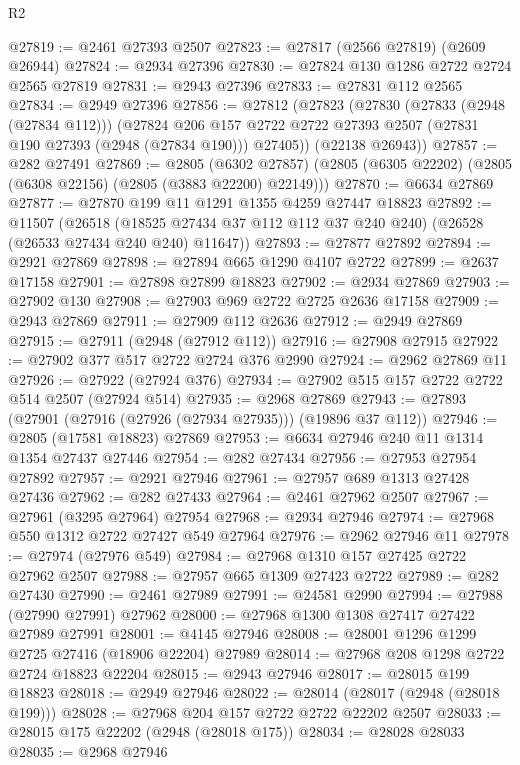 \begin{lexlean}{R2}
\begin{coremodule}
@27819 := @2461 @27393 @2507
@27823 := @27817 (@2566 @27819) (@2609 @26944)
@27824 := @2934 @27396
@27830 := @27824 @130 @1286 @2722 @2724 @2565 @27819
@27831 := @2943 @27396
@27833 := @27831 @112 @2565
@27834 := @2949 @27396
@27856 := @27812
    (@27823
      (@27830
        (@27833 (@2948 (@27834 @112)))
        (@27824
          @206
          @157
          @2722
          @2722
          @27393
          @2507
          (@27831 @190 @27393 (@2948 (@27834 @190)))
          @27405))
      (@22138 @26943))
@27857 := @282 @27491
@27869 := @2805
    (@6302 @27857)
    (@2805 (@6305 @22202) (@2805 (@6308 @22156) (@2805 (@3883 @22200) @22149)))
@27870 := @6634 @27869
@27877 := @27870 @199 @11 @1291 @1355 @4259 @27447 @18823
@27892 := @11507
    (@26518 (@18525 @27434 @37 @112 @112 @37 @240 @240) (@26528 (@26533 @27434 @240 @240) @11647))
@27893 := @27877 @27892
@27894 := @2921 @27869
@27898 := @27894 @665 @1290 @4107 @2722
@27899 := @2637 @17158
@27901 := @27898 @27899 @18823
@27902 := @2934 @27869
@27903 := @27902 @130
@27908 := @27903 @969 @2722 @2725 @2636 @17158
@27909 := @2943 @27869
@27911 := @27909 @112 @2636
@27912 := @2949 @27869
@27915 := @27911 (@2948 (@27912 @112))
@27916 := @27908 @27915
@27922 := @27902 @377 @517 @2722 @2724 @376 @2990
@27924 := @2962 @27869 @11
@27926 := @27922 (@27924 @376)
@27934 := @27902 @515 @157 @2722 @2722 @514 @2507 (@27924 @514)
@27935 := @2968 @27869
@27943 := @27893 (@27901 (@27916 (@27926 (@27934 @27935))) (@19896 @37 @112))
@27946 := @2805 (@17581 @18823) @27869
@27953 := @6634 @27946 @240 @11 @1314 @1354 @27437 @27446
@27954 := @282 @27434
@27956 := @27953 @27954 @27892
@27957 := @2921 @27946
@27961 := @27957 @689 @1313 @27428 @27436
@27962 := @282 @27433
@27964 := @2461 @27962 @2507
@27967 := @27961 (@3295 @27964) @27954
@27968 := @2934 @27946
@27974 := @27968 @550 @1312 @2722 @27427 @549 @27964
@27976 := @2962 @27946 @11
@27978 := @27974 (@27976 @549)
@27984 := @27968 @1310 @157 @27425 @2722 @27962 @2507
@27988 := @27957 @665 @1309 @27423 @2722
@27989 := @282 @27430
@27990 := @2461 @27989
@27991 := @24581 @2990
@27994 := @27988 (@27990 @27991) @27962
@28000 := @27968 @1300 @1308 @27417 @27422 @27989 @27991
@28001 := @4145 @27946
@28008 := @28001 @1296 @1299 @2725 @27416 (@18906 @22204) @27989
@28014 := @27968 @208 @1298 @2722 @2724 @18823 @22204
@28015 := @2943 @27946
@28017 := @28015 @199 @18823
@28018 := @2949 @27946
@28022 := @28014 (@28017 (@2948 (@28018 @199)))
@28028 := @27968 @204 @157 @2722 @2722 @22202 @2507
@28033 := @28015 @175 @22202 (@2948 (@28018 @175))
@28034 := @28028 @28033
@28035 := @2968 @27946

\end{coremodule}
\end{lexlean}
